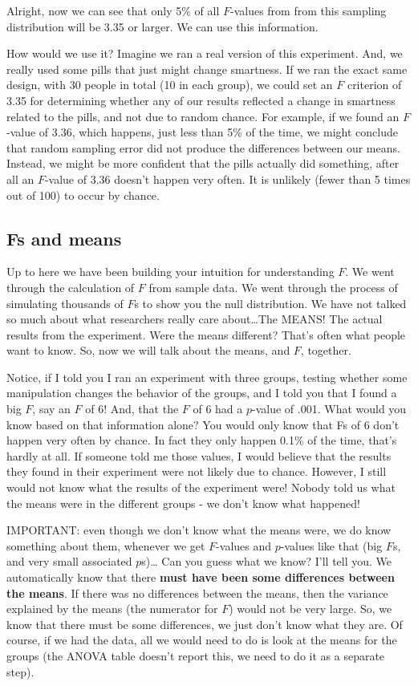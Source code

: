 \documentclass[
]{book}
\begin{document}
Alright, now we can see that only 5\% of all \(F\)-values from from this sampling distribution will be 3.35 or larger. We can use this information.

How would we use it? Imagine we ran a real version of this experiment. And, we really used some pills that just might change smartness. If we ran the exact same design, with 30 people in total (10 in each group), we could set an \(F\) criterion of 3.35 for determining whether any of our results reflected a change in smartness related to the pills, and not due to random chance. For example, if we found an \(F\)-value of 3.36, which happens, just less than 5\% of the time, we might conclude that random sampling error did not produce the differences between our means. Instead, we might be more confident that the pills actually did something, after all an \(F\)-value of 3.36 doesn't happen very often. It is unlikely (fewer than 5 times out of 100) to occur by chance.

\subsection{Fs and means}\label{fs-and-means}

Up to here we have been building your intuition for understanding \(F\). We went through the calculation of \(F\) from sample data. We went through the process of simulating thousands of \(F\)s to show you the null distribution. We have not talked so much about what researchers really care about\ldots The MEANS! The actual results from the experiment. Were the means different? That's often what people want to know. So, now we will talk about the means, and \(F\), together.

Notice, if I told you I ran an experiment with three groups, testing whether some manipulation changes the behavior of the groups, and I told you that I found a big \(F\), say an \(F\) of 6! And, that the \(F\) of 6 had a \(p\)-value of .001. What would you know based on that information alone? You would only know that Fs of 6 don't happen very often by chance. In fact they only happen 0.1\% of the time, that's hardly at all. If someone told me those values, I would believe that the results they found in their experiment were not likely due to chance. However, I still would not know what the results of the experiment were! Nobody told us what the means were in the different groups - we don't know what happened!

IMPORTANT: even though we don't know what the means were, we do know something about them, whenever we get \(F\)-values and \(p\)-values like that (big \(F\)s, and very small associated \(p\)s)\ldots{} Can you guess what we know? I'll tell you. We automatically know that there \textbf{must have been some differences between the means}. If there was no differences between the means, then the variance explained by the means (the numerator for \(F\)) would not be very large. So, we know that there must be some differences, we just don't know what they are. Of course, if we had the data, all we would need to do is look at the means for the groups (the ANOVA table doesn't report this, we need to do it as a separate step).
\end{document}
